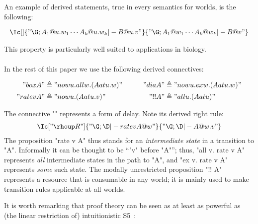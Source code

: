 \documentclass{article}
\begin{document}
An example of derived statements, true in every semantics for worlds, is the following:
\begin{proposition}[relocalisation]
\label{thm:relocalisation}
\begin{gather*}
  \Ic[]{"\G ; A_1 @ {u . w_1} \cdots A_k @ {u . w_k} |- B @ {u . v}"}
         {"\G ; A_1 @ w_1 \cdots  A_k @ w_k |- B @ v"}
\end{gather*}
\end{proposition}
This property is particularly well suited to applications in biology.

\paragraph{}
In the rest of this paper we use the following derived connectives:

\bgroup \begin{defn} \label{defn:connectives} \mbox{}
\vspace{-1ex}
  \begin{gather*}
    \begin{aligned}
      "box A" &\triangleq "now u. all w. (A at u . w)" & \qquad
      "dia A" &\triangleq "now u. ex w. (A at u . w)" \\
      "rate v A" &\triangleq "now u. (A at u . v)" &
      "!! A" &\triangleq "all u. (A at u)"
    \end{aligned}
  \end{gather*}
\end{defn}
\egroup

\noindent
The connective "\rhoup" represents a form of delay. Note its derived right rule:
\begin{gather*}
  \Ic["\rhoup R"]{"\G ; \D |- rate v A @ w"}{"\G ; \D |- A @ {w . v}"}
\end{gather*}
The proposition "rate v A" thus stands for an \emph{intermediate state} in a
transition to "A". Informally it can be thought to be ``"v" before "A"''; thus,
"all v. rate v A" represents \emph{all} intermediate states in the path to "A",
and "ex v. rate v A" represents \emph{some} such state.  The modally
unrestricted proposition "!! A" represents a resource that is consumable in any
world; it is mainly used to make transition rules applicable at all worlds.

It is worth remarking that \hyll proof theory can be seen as at least as
powerful as (the linear restriction of) intuitionistic S5~\cite{simpson94phd}:
\end{document}
